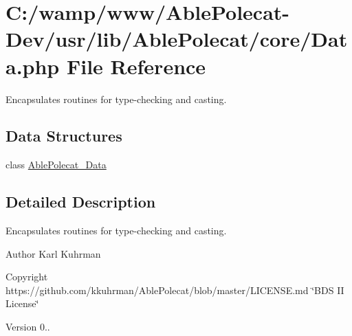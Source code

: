 \hypertarget{_data_8php}{}\section{C\+:/wamp/www/\+Able\+Polecat-\/\+Dev/usr/lib/\+Able\+Polecat/core/\+Data.php File Reference}
\label{_data_8php}


Encapsulates routines for type-\/checking and casting.  


\subsection*{Data Structures}
\begin{DoxyCompactItemize}
\item 
class \hyperlink{class_able_polecat___data}{Able\+Polecat\+\_\+\+Data}
\end{DoxyCompactItemize}


\subsection{Detailed Description}
Encapsulates routines for type-\/checking and casting. 

\begin{DoxyAuthor}{Author}
Karl Kuhrman 
\end{DoxyAuthor}
\begin{DoxyCopyright}{Copyright}
https\+://github.com/kkuhrman/\+Able\+Polecat/blob/master/\+L\+I\+C\+E\+N\+S\+E.\+md \char`\"{}\+B\+D\+S I\+I License\char`\"{} 
\end{DoxyCopyright}
\begin{DoxyVersion}{Version}
0.. 
\end{DoxyVersion}
